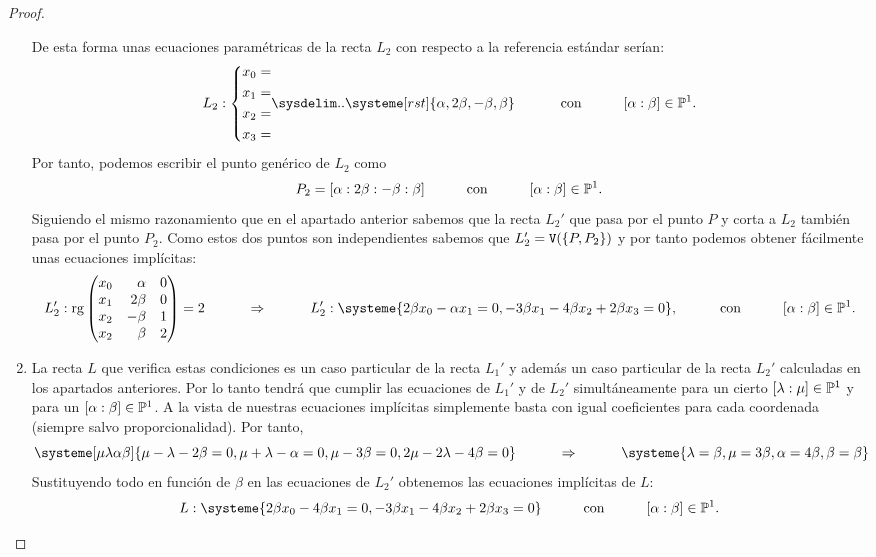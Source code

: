 \documentclass{homeworg}
\begin{document}
\begin{proof}
\begin{enumerate}[label=\roman*)]
     De esta forma unas ecuaciones paramétricas de la recta $L_2$ con respecto a la referencia estándar serían:
         \begin{equation*}
            L_2:\left\{\begin{aligned} x_{0}& =\\x_1 & = \\x_2 & =\\x_3 & =\\\end{aligned}\sysdelim. . \systeme[rst]{\alpha , 2\beta, {-}\beta, \beta}\right.\hmid \text{con}\hmid \qty[\alpha:\beta] \in \P^1.
         \end{equation*}
   Por tanto, podemos escribir el punto genérico de $L_2$ como $$P_2=\qty[\alpha: 2\beta: -\beta: \beta]\hspace{3em}\text{con}\hspace{3em}\qty[ \alpha:\beta] \in \mathbb{P}^1.$$ Siguiendo el mismo razonamiento que en el apartado anterior sabemos que la recta $L_2'$ que pasa por el punto $P$ y corta a $L_2$ también pasa por el punto $P_2$. Como estos dos puntos son independientes sabemos que $L_2'=\texttt{V}(\{P,P_2\})$ y por tanto podemos obtener fácilmente unas ecuaciones implícitas:
\begin{equation*}
         L_2': \rg\begin{pmatrix*}[r]
         x_0 & \alpha & 0 \\ 
         x_1 & 2\beta & 0 \\ 
         x_2 & -\beta & 1 \\ 
         x_2 & \beta & 2 \end{pmatrix*}=2 \hmidthen L_2': \systeme{2\beta x_0 -\alpha x_1=0, -3\beta x_1-4\beta x_2+2\beta x_3=0},\hmid \text{con}\hmid \qty[\alpha:\beta]\in\P^{1}.
     \end{equation*}

\item La recta $L$ que verifica estas condiciones es un caso particular de la recta $L_1'$ y además un caso particular de la recta $L_2'$ calculadas en los apartados anteriores. Por lo tanto tendrá que cumplir las ecuaciones de $L_1'$ y de $L_2'$ simultáneamente para un cierto $\qty[\lambda:\mu] \in \mathbb{P}^1$ y para un $\qty[\alpha:\beta] \in \mathbb{P}^1$. A la vista de nuestras ecuaciones implícitas simplemente basta con igual coeficientes para cada coordenada (siempre salvo proporcionalidad). Por tanto,
    \begin{equation*}
        \systeme[\mu \lambda \alpha \beta]{\mu - \lambda -2\beta =  0 , \mu + \lambda -\alpha = 0 , \mu -3\beta = 0 , 2\mu - 2\lambda -4\beta=  0} \hmidthen \systeme{\lambda=\beta,\mu=3\beta,\alpha=4\beta,\beta=\beta}
    \end{equation*}
    Sustituyendo todo en función de $\beta$ en las ecuaciones de $L_2'$ obtenemos las ecuaciones implícitas de $L$:
    \begin{equation*}
           L: \systeme{2\beta x_0 -4\beta x_1    =0, -3\beta x_1-4\beta x_2+2\beta x_3=0} \hmid\text{con}\hmid \qty[\alpha:\beta] \in \P^1.
     \end{equation*}
     

\end{enumerate}
\end{proof}
\end{document}
